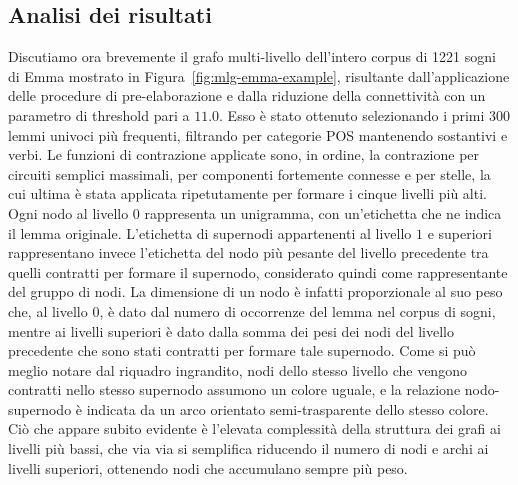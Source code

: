 \subsection{Analisi dei risultati}\label{subsec:analisi-del-grafo-multi-livello}

Discutiamo ora brevemente il grafo multi-livello dell'intero corpus di 1221 sogni di Emma mostrato in
Figura~\ref{fig:mlg-emma-example}, risultante dall'applicazione delle procedure di pre-elaborazione e dalla riduzione
della connettività con un parametro di threshold pari a $11.0$.
Esso è stato ottenuto selezionando i primi 300 lemmi univoci più frequenti, filtrando per categorie POS mantenendo
sostantivi e verbi.
Le funzioni di contrazione applicate sono, in ordine, la contrazione per circuiti semplici massimali,
per componenti fortemente connesse e per stelle, la cui ultima è stata applicata ripetutamente per
formare i cinque livelli più alti.
Ogni nodo al livello $0$ rappresenta un unigramma, con un'etichetta che ne indica il lemma originale. L'etichetta di
supernodi appartenenti al livello $1$ e superiori rappresentano invece l'etichetta del nodo più pesante del livello
precedente tra quelli contratti per formare il supernodo, considerato quindi come rappresentante del gruppo di nodi.
La dimensione di un nodo è infatti proporzionale al suo peso che, al livello $0$, è dato dal numero di occorrenze del
lemma nel corpus di sogni, mentre ai livelli superiori è dato dalla somma dei pesi dei nodi del livello precedente che
sono stati contratti per formare tale supernodo.
Come si può meglio notare dal riquadro ingrandito, nodi dello stesso livello che vengono contratti nello stesso
supernodo assumono un colore uguale, e la relazione nodo-supernodo è indicata da un arco orientato
semi-trasparente dello stesso colore.
Ciò che appare subito evidente è l'elevata complessità della struttura dei grafi ai livelli più bassi, che
via via si semplifica riducendo il numero di nodi e archi ai livelli superiori, ottenendo nodi che accumulano
sempre più peso.

